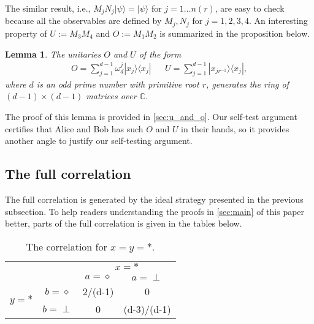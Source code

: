 \documentclass[11pt,letterpaper]{article}
\newcommand{\ket}[1]{|#1\rangle}
\newcommand{\ketbra}[2]{|#1\rangle\langle#2|}
\newcommand{\C}{\mathbb{C}}
\newcommand{\1}{\mathbb{1}}
\newcommand{\nr}{n(r)}
\newtheorem{lemma}[theorem]{Lemma}
\theoremstyle{definition}
\begin{document}
The similar result, i.e., $M_jN_j \ket{\psi} = \ket{\psi}$ for $j = 1 \dots \nr$, are easy to check because all the observables are defined by $M_j, N_j$ for $j=1,2,3,4$.
An interesting property of $U := M_3M_4$ and $O := M_1M_2$ is summarized in the proposition below. 
\begin{lemma}
	\label{lm:uo_independ}
	The unitaries $O$ and $U$ of the form
	\begin{align}
		O = \sum_{j=1}^{d-1} \omega_d^j \ketbra{x_j}{x_j} && U = \sum_{j=1}^{d-1}\ketbra{x_{j r^{-1}}}{x_j},
	\end{align}
	where $d$ is an odd prime number with primitive root $r$, generates
	the ring of $(d-1)\times (d-1)$ matrices over $\C$.
\end{lemma}
The proof of this lemma is provided in \cref{sec:u_and_o}.
Our self-test argument certifies that Alice and Bob has such $O$ and $U$ in their hands, so
it provides another angle to justify our self-testing argument.

\subsection{The full correlation}
The full correlation is generated by the ideal strategy presented in the previous subsection.
To help readers understanding the proofs in \cref{sec:main} of this paper better, 
parts of the full correlation is given in the tables below.
\begin{table}[H]
\begin{center}
\begin{tabular}{|c|c||c|c|}
\hline
\multicolumn{2}{|c|}{} &
\multicolumn{2}{|c|}{$x=\ast$}\\
\cline{3-4}
\multicolumn{2}{|c|}{} &$a = \diamond$ & $a = \perp$ \\
\hline
\hline
\multirow{2}{*}{$y = \ast$} & $b=\diamond$ & 2/(d-1) & 0 \\
\cline{2-4}
&$b=\perp$ & 0 & (d-3)/(d-1) \\
\hline
\end{tabular}
\caption{The correlation for $x=y=\ast$.}
\end{center}
\end{table}
\end{document}
